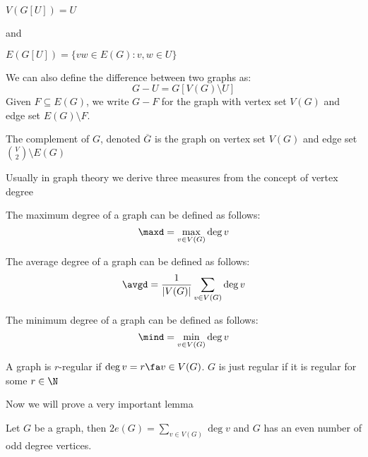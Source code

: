 $V(G[U]) = U$

and

$E(G[U]) = \{vw \in E(G): v, w \in U\}$

We can also define the difference between two graphs as:
\begin{equation*}
    G - U = G[V(G) \setminus U]
\end{equation*}
Given $F \subseteq E(G)$, we write $G - F$ for the graph with vertex set $V(G)$ and edge set $E(G) \setminus F$.
\begin{definition}[Complement]
    The complement of $G$, denoted $\overline{G}$ is the graph on vertex set $V(G)$ and edge set $\binom{V}{2} \setminus E(G)$
\end{definition}
Usually in graph theory we derive three measures from the concept of vertex degree
\begin{definition}
    The maximum degree of a graph can be defined as follows:
    \begin{equation*}
        \maxd = \max_{v \in V(G)}\deg{v}
    \end{equation*}
\end{definition}
\begin{definition}
    The average degree of a graph can be defined as follows:
    \begin{equation*}
        \avgd = \frac{1}{|V(G)|}\sum_{v \in V(G)}\deg{v}
    \end{equation*}
\end{definition}
\begin{definition}
    The minimum degree of a graph can be defined as follows:
    \begin{equation*}
        \mind = \min_{v \in V(G)}\deg{v}
    \end{equation*}
\end{definition}
\begin{definition}
    A graph is $r$-regular if $\deg{v} = r \fa v \in V(G)$. $G$ is just regular if it is regular for some $r \in \N$
\end{definition}
Now we will prove a very important lemma
\begin{lemma}
    Let $G$ be a graph, then $2e(G) = \sum_{v \in V(G)}\deg{v}$ and $G$ has an even number of odd degree vertices.
\end{lemma}
